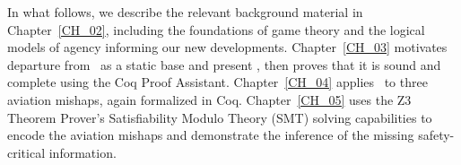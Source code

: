  

In what follows, we describe the relevant background material in Chapter~\ref{CH_02}, including the foundations of game theory and the logical models of agency informing our new developments. Chapter~\ref{CH_03} motivates departure from \SFive\ as a static base and present \DASL, then proves that it is sound and complete using the Coq Proof Assistant. Chapter~\ref{CH_04} applies \DASL\ to three aviation mishaps, again formalized in Coq. Chapter~\ref{CH_05} uses the Z3 Theorem Prover's Satisfiability Modulo Theory (SMT) solving capabilities to encode the aviation mishaps and demonstrate the inference of the missing safety-critical information.
